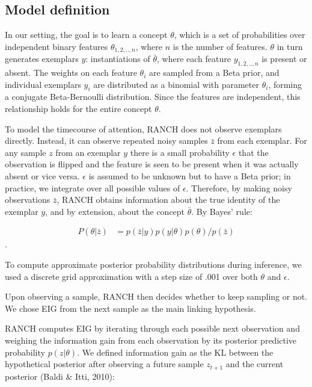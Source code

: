 \documentclass[10pt, letterpaper]{article}
\begin{document}
\hypertarget{model-definition}{%
\subsection{Model definition}\label{model-definition}}

In our setting, the goal is to learn a concept \(\theta\), which is a
set of probabilities over independent binary features
\(\theta_{1,2,..,n}\), where \(n\) is the number of features. \(\theta\)
in turn generates exemplars \(y\): instantiations of \(\bar{\theta}\),
where each feature \(y_{1,2,..,n}\) is present or absent. The weights on
each feature \(\theta_i\) are sampled from a Beta prior, and individual
exemplars \(y_i\) are distributed as a binomial with parameter
\(\theta_i\), forming a conjugate Beta-Bernoulli distribution. Since the
features are independent, this relationship holds for the entire concept
\(\theta\).

To model the timecourse of attention, RANCH does not observe exemplars
directly. Instead, it can observe repeated noisy samples \(\bar{z}\)
from each exemplar. For any sample \(z\) from an exemplar \(y\) there is
a small probability \(\epsilon\) that the observation is flipped and the
feature is seen to be present when it was actually absent or vice versa.
\(\epsilon\) is assumed to be unknown but to have a Beta prior; in
practice, we integrate over all possible values of \(\epsilon\).
Therefore, by making noisy observations \(\bar{z}\), RANCH obtains
information about the true identity of the exemplar \(y\), and by
extension, about the concept \(\bar{\theta}\). By Bayes' rule:

\begin{eqnarray}
P(\theta|\bar{z}) &= p(\bar{z}|y) p(y|\theta) p(\theta) / p(\bar{z})
\end{eqnarray}.

To compute approximate posterior probability distributions during
inference, we used a discrete grid approximation with a step size of
.001 over both \(\theta\) and \(\epsilon\).

Upon observing a sample, RANCH then decides whether to keep sampling or
not. We chose EIG from the next sample as the main linking hypothesis.

RANCH computes EIG by iterating through each possible next observation
and weighing the information gain from each observation by its posterior
predictive probability \(p(z|\theta)\). We defined information gain as
the KL between the hypothetical posterior after observing a future
sample \(z_{t+1}\) and the current posterior (Baldi \& Itti, 2010):
\end{document}

